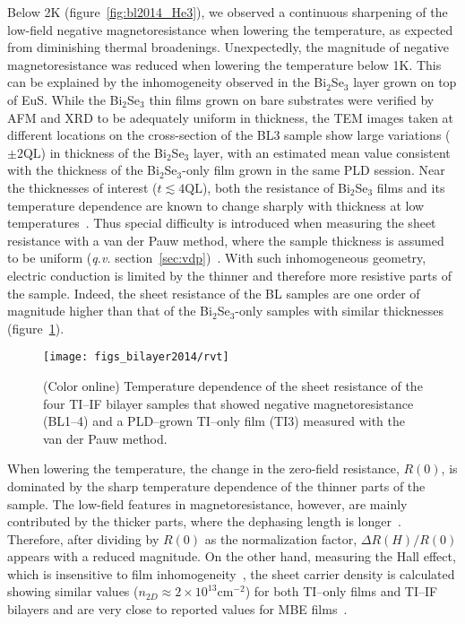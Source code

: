 Below 2K (figure~\ref{fig:bl2014_He3}), we observed a continuous sharpening of the low-field negative magnetoresistance when lowering the temperature, as expected from diminishing thermal broadenings. Unexpectedly, the magnitude of negative magnetoresistance was reduced when lowering the temperature below 1K. This can be explained by the inhomogeneity observed in the Bi$_2$Se$_3$ layer grown on top of EuS. While the Bi$_2$Se$_3$ thin films grown on bare substrates were verified by AFM and XRD to be adequately uniform in thickness, the TEM images taken at different locations on the cross-section of the BL3 sample show large variations ($\pm2\mathrm{QL}$) in thickness of the Bi$_2$Se$_3$ layer, with an estimated mean value consistent with the thickness of the Bi$_2$Se$_3$-only film grown in the same PLD session. Near the thicknesses of interest ($t\lesssim4\mathrm{QL}$), both the resistance of Bi$_2$Se$_3$ films and its temperature dependence are known to change sharply with thickness at low temperatures~\cite{TI_WAL_thickness}. Thus special difficulty is introduced when measuring the sheet resistance with a van der Pauw method, where the sample thickness is assumed to be uniform (\textit{q.v.} section~\ref{sec:vdp})~\cite{VdP1958, VdP_contact_size}. With such inhomogeneous geometry, electric conduction is limited by the thinner and therefore more resistive parts of the sample. Indeed, the sheet resistance of the BL samples are one order of magnitude higher than that of the Bi$_2$Se$_3$-only samples with similar thicknesses (figure~\ref{fig:bl2014_RvT}).%
%
\begin{figure}[ht]%
    \centering%
    \texttt{[image: figs\_bilayer2014/rvt]}%
    \caption[Temperature dependence of the sheet resistance of Bi$_2$Se$_3$--EuS bilayers]{\label{fig:bl2014_RvT}(Color online) Temperature dependence of the sheet resistance of the four TI--IF bilayer samples that showed negative magnetoresistance (BL1--4) and a PLD--grown TI--only film (TI3) measured with the van der Pauw method.}%
    \end{figure} %
%
When lowering the temperature, the change in the zero-field resistance, $R(0)$, is dominated by the sharp temperature dependence of the thinner parts of the sample. The low-field features in magnetoresistance, however, are mainly contributed by the thicker parts, where the dephasing length is longer~\cite{TI_WAL_thickness}. Therefore, after dividing by $R(0)$ as the normalization factor, $\Delta{}R(H)/R(0)$ appears with a reduced magnitude. On the other hand, measuring the Hall effect, which is insensitive to film inhomogeneity~\cite{Landauer_Porous_Media}, the sheet carrier density is calculated showing similar values (\(n_{2D}\approx2\times10^{13}\mathrm{cm^{-2}}\)) for both TI--only films and TI--IF bilayers and are very close to reported values for MBE films~\cite{TI_WAL_thickness}.

